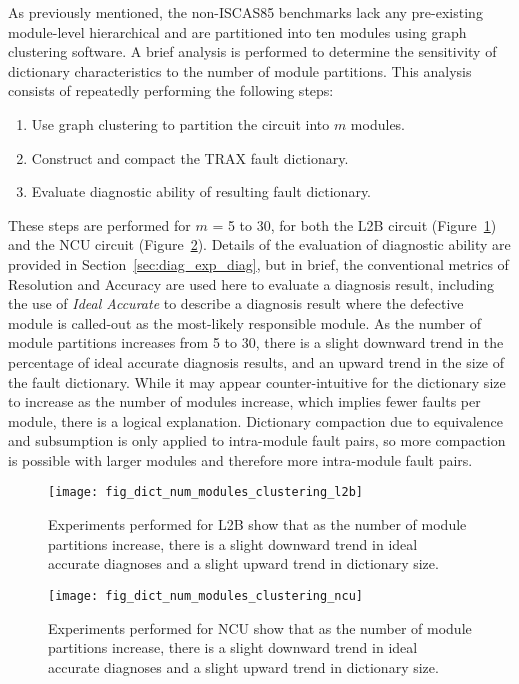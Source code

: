 As previously mentioned, the non-ISCAS85 benchmarks lack any pre-existing module-level hierarchical and are partitioned into ten modules using graph clustering software.
%
A brief analysis is performed to determine the sensitivity of dictionary characteristics to the number of module partitions.
%
This analysis consists of repeatedly performing the following steps:
\begin{enumerate}
\item Use graph clustering to partition the circuit into $m$ modules.
\item Construct and compact the TRAX fault dictionary.
\item Evaluate diagnostic ability of resulting fault dictionary.
\end{enumerate}
These steps are performed for $m$ = 5 to 30, for both the L2B circuit (Figure~\ref{fig:dict_num_modules_clustering_l2b}) and the NCU circuit (Figure~\ref{fig:dict_num_modules_clustering_ncu}).
%
Details of the evaluation of diagnostic ability are provided in Section~\ref{sec:diag_exp_diag}, but in brief, the conventional metrics of Resolution and Accuracy are used here to evaluate a diagnosis result, including the use of \textit{Ideal Accurate} to describe a diagnosis result where the defective module is called-out as the most-likely responsible module.
%
As the number of module partitions increases from 5 to 30, there is a slight downward trend in the percentage of ideal accurate diagnosis results, and an upward trend in the size of the fault dictionary.
%
While it may appear counter-intuitive for the dictionary size to increase as the number of modules increase, which implies fewer faults per module, there is a logical explanation.
%
Dictionary compaction due to equivalence and subsumption is only applied to intra-module fault pairs, so more compaction is possible with larger modules and therefore more intra-module fault pairs.

\begin{figure}[htbp]
\centering
\texttt{[image: fig\_dict\_num\_modules\_clustering\_l2b]}
\caption{Experiments performed for L2B show that as the number of module partitions increase, there is a slight downward trend in ideal accurate diagnoses and a slight upward trend in dictionary size.}
\label{fig:dict_num_modules_clustering_l2b}
\end{figure}

\begin{figure}[htbp]
\centering
\texttt{[image: fig\_dict\_num\_modules\_clustering\_ncu]}
\caption{Experiments performed for NCU show that as the number of module partitions increase, there is a slight downward trend in ideal accurate diagnoses and a slight upward trend in dictionary size.}
\label{fig:dict_num_modules_clustering_ncu}
\end{figure}

